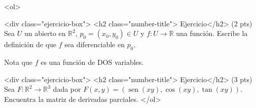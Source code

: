 \documentclass[12pt]{article}
\newcommand{\sen}{\operatorname{sen}}
\begin{document}
\bigskip

            
\bigskip
\bigskip
\bigskip


<ol>

<div class="ejercicio-box"> <h2 class="number-title"> Ejercicio</h2> (2 pts) Sea $U$ un abierto en $\mathbb{R}^2$, $p_0=(x_0,y_0)\in U$
  y $f:U\to \mathbb{R}$ una
  función. Escribe la definición de que $f$ sea diferenciable en $p_0$.

  Nota  que $f$ es una función de DOS variables.
  
  
\vspace{5cm}  
  
<div class="ejercicio-box"> <h2 class="number-title"> Ejercicio</h2> (3 pts) Sea $F:\mathbb{R}^2 \to \mathbb{R}^3$ dada por $F(x,y)=(\sen(xy), \cos(xy),\tan(xy))$.
  Encuentra la matriz de derivadas parciales.
  </ol>


  
\end{document}

